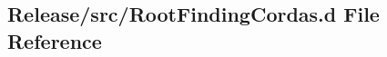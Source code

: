 \hypertarget{RootFindingCordas_8d}{
\subsection{Release/src/RootFindingCordas.d File Reference}
\label{RootFindingCordas_8d}
}
